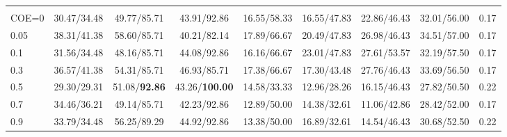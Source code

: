 \begin{table}[t]
\begin{tabular}{@{}lcccccccc@{}}
\rowcolor{gray!15}
\multicolumn{9}{@{}l@{}}{\textbf{\textbf{BudgetMem-\textsc{Cap}} (COE)}} \\
COE=0   & 30.47/34.48 & 49.77/85.71 & 43.91/92.86 & 16.55/58.33 & 16.55/47.83 & 22.86/46.43 & 32.01/56.00 & 0.17 \\
0.05    & 38.31/41.38 & 58.60/85.71 & 40.21/82.14 & 17.89/66.67 & 20.49/47.83 & 26.98/46.43 & 34.51/57.00 & 0.17 \\
0.1     & 31.56/34.48 & 48.16/85.71 & 44.08/92.86 & 16.16/66.67 & 23.01/47.83 & 27.61/53.57 & 32.19/57.50 & 0.17 \\
0.3     & 36.57/41.38 & 54.31/85.71 & 46.93/85.71 & 17.38/66.67 & 17.30/43.48 & 27.76/46.43 & 33.69/56.50 & 0.17 \\
0.5     & 29.30/29.31 & 51.08/\textbf{92.86} & 43.26/\textbf{100.00} & 14.58/33.33 & 12.96/28.26 & 16.15/46.43 & 27.82/50.50 & 0.22 \\
0.7     & 34.46/36.21 & 49.14/85.71 & 42.23/92.86 & 12.89/50.00 & 14.38/32.61 & 11.06/42.86 & 28.42/52.00 & 0.17 \\
0.9     & 33.79/34.48 & 56.25/89.29 & 44.92/92.86 & 13.38/50.00 & 16.89/32.61 & 14.54/46.43 & 30.68/52.50 & 0.22 \\
\bottomrule
\end{tabular}
\end{table}